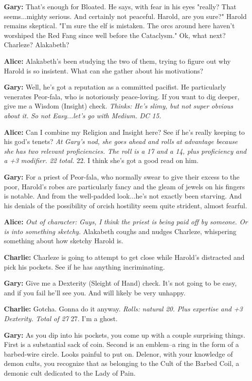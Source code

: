 \textbf{Gary:} That's enough for Bloated. He says, with fear in his eyes "really? That seems...mighty serious. And certainly not peaceful. Harold, are you sure?" Harold remains skeptical. "I'm sure the elf is mistaken. The orcs around here haven't worshiped the Red Fang since well before the Cataclysm." Ok, what next? Charleze? Alakabeth?

\textbf{Alice:} Alakabeth's been studying the two of them, trying to figure out why Harold is so insistent. What can she gather about his motivations?

\textbf{Gary:} Well, he's got a reputation as a committed pacifist. He particularly venerates Peor-fala, who is notoriously peace-loving. If you want to dig deeper, give me a Wisdom (Insight) check. \textit{Thinks: He's slimy, but not super obvious about it. So not Easy...let's go with Medium. DC 15.}

\textbf{Alice:} Can I combine my Religion and Insight here? See if he's really keeping to his god's tenets? \textit{At Gary's nod, she goes ahead and rolls at advantage because she has two relevant proficiencies. The roll is a 17 and a 14, plus proficiency and a +3 modifier. 22 total.} 22. I think she's got a good read on him.

\textbf{Gary:} For a priest of Peor-fala, who normally swear to give their excess to the poor, Harold's robes are particularly fancy and the gleam of jewels on his fingers is notable. And from the well-padded look...he's not exactly been starving. And his denials of the possibility of orcish hostility seem quite strident, almost fearful.

\textbf{Alice:} \textit{Out of character: Guys, I think the priest is being paid off by someone. Or is into something sketchy.} Alakabeth coughs and nudges Charleze, whispering something about how sketchy Harold is.

\textbf{Charlie:} Charleze is going to attempt to get close while Harold's distracted and pick his pockets. See if he has anything incriminating.

\textbf{Gary:} Give me a Dexterity (Sleight of Hand) check. It's not going to be easy, and if you fail he'll see you. And will likely be very unhappy.

\textbf{Charlie:} Gotcha. Gonna do it anyway. \textit{Rolls: natural 20. Plus expertise and +3 Dexterity. Total of 27} 27. I'm a ghost.

\textbf{Gary:} As you dip into his pockets, you come up with a couple surprising things. First is a substantial sack of coin. Second is an emblem--a ring in the form of a barbed-wire circle. Looks painful to put on. Delenor, with your knowledge of demon cults, you recognize that as belonging to the Cult of the Barbed Coil, a demonic cult dedicated to the Lady of Pain.

